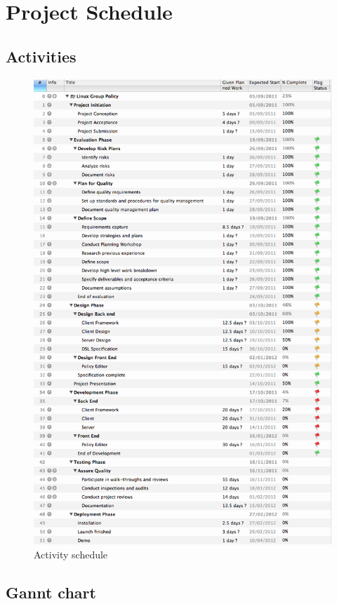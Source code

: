 \chapter{Project Schedule}

	\section{Activities}
		\begin{figure}[h!]
			\centering
			\includegraphics[width=14cm]{figures/activities.png}
	  		\caption{Activity schedule}
		\end{figure}
		
	\section{Gannt chart}
	

